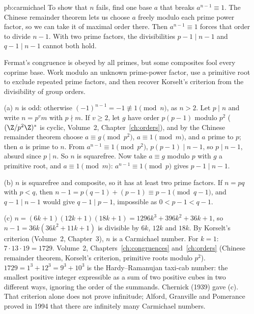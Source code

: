 \begin{solution}{pb:carmichael}
\idea To show that $n$ fails, find one base $a$ that breaks $a^{n-1}\equiv1$. The Chinese remainder theorem lets us choose
$a$ freely modulo each prime power factor, so we can take it of maximal order there. Then $a^{n-1}\equiv1$ forces that order
to divide $n-1$. With two prime factors, the divisibilities $p-1\mid n-1$ and $q-1\mid n-1$ cannot both hold.

\writeup
Fermat's congruence is obeyed by all primes, but some composites fool every coprime base. Work modulo an unknown prime-power factor, use a primitive root to exclude repeated prime factors, and then recover Korselt's criterion from the divisibility of group orders.

 (a) $n$ is odd: otherwise $(-1)^{n-1}=-1\not\equiv1\pmod n$, as $n>2$. Let $p\mid n$ and write $n=p^vm$ with $p\nmid m$.
If $v\ge2$, let $g$ have order $p(p-1)$ modulo $p^2$ ($(\Z/p^2\Z)^*$ is cyclic, Volume~2, Chapter~\ref{ch:orders}), and by the Chinese
remainder theorem choose $a\equiv g\pmod{p^2}$, $a\equiv1\pmod m$, and $a$ prime to $p$; then $a$ is prime to $n$. From
$a^{n-1}\equiv1\pmod{p^2}$, $p(p-1)\mid n-1$, so $p\mid n-1$, absurd since $p\mid n$. So $n$ is squarefree. Now take $a\equiv g$
modulo $p$ with $g$ a primitive root, and $a\equiv1\pmod m$: $a^{n-1}\equiv1\pmod p$ gives $p-1\mid n-1$.

(b) $n$ is squarefree and composite, so it has at least two prime factors. If $n=pq$ with $p<q$, then
$n-1=p(q-1)+(p-1)\equiv p-1\pmod{q-1}$, and $q-1\mid n-1$ would give $q-1\mid p-1$, impossible as $0<p-1<q-1$.

(c) $n=(6k+1)(12k+1)(18k+1)=1296k^3+396k^2+36k+1$, so $n-1=36k(36k^2+11k+1)$ is divisible by $6k$, $12k$ and $18k$. By
Korselt's criterion (Volume~2, Chapter~3), $n$ is a Carmichael number. For $k=1$: $7\cdot13\cdot19=1729$.
\tools Volume~2, Chapters~\ref{ch:congruences} and~\ref{ch:orders} (Chinese remainder theorem, Korselt's criterion, primitive roots modulo $p^2$).
\leads $1729=1^3+12^3=9^3+10^3$ is the Hardy--Ramanujan taxi-cab number: the smallest positive integer expressible as a sum of two positive cubes in two different ways, ignoring the order of the summands.
Chernick (1939) gave (c). That criterion alone does not prove infinitude; Alford, Granville and Pomerance proved
in 1994 that there are infinitely many Carmichael numbers.
\end{solution}


